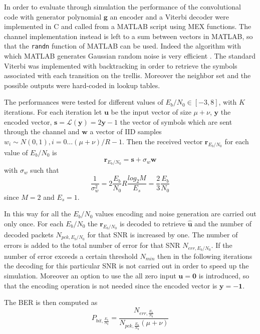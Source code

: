 \documentclass[10pt]{article}
\begin{document}
In order to evaluate through simulation the performance of the convolutional code with generator polynomial $\mathbf{g}$ an encoder and a Viterbi decoder were implemented in C and called from a MATLAB script using MEX functions. 
The channel implementation instead is left to a sum between vectors in MATLAB, so that the \texttt{randn} function of MATLAB can be used. Indeed the algorithm with which MATLAB generates Gaussian random noise is very efficient \cite{moler}. The standard Viterbi was implemented with backtracking in order to retrieve the symbols associated with each transition on the trellis. Moreover the neighbor set and the possible outputs were hard-coded in lookup tables. 


The performances were tested for different values of $E_b/N_0 \in [-3, 8]$, with $K$ iterations. For each iteration let $\mathbf{u}$ be the input vector of size $\mu + \nu$, $\mathbf{y}$ the encoded vector, $\mathbf{s} = \mathcal{L}(\mathbf{y}) = 2\mathbf{y} - 1$ the vector of symbols which are sent through the channel and $\mathbf{w}$ a vector of IID samples $w_i \sim N(0,1), i = 0 \dots (\mu + \nu)/R - 1$. Then the received vector $\mathbf{r}_{E_b/N_0}$ for each value of $E_b/N_0$ is 
\begin{equation}
	\mathbf{r}_{E_b/N_0} = \mathbf{s} + \sigma_w \mathbf{w}
\end{equation}
with $\sigma_w$ such that
\begin{equation}
	\frac{1}{\sigma_w^2} = 2\frac{E_b}{N_0}R\frac{log_2M}{E_s} = \frac{2}{3} \frac{E_b}{N_0}
\end{equation}
since $M=2$ and $E_s = 1$.

In this way for all the $E_b/N_0$ values encoding and noise generation are carried out only once. For each $E_b/N_0$ the $\mathbf{r}_{E_b/N_0}$ is decoded to retrieve $\mathbf{\hat{u}}$ and the number of decoded packets $N_{pck, E_b/N_0}$ for that SNR is increased by one. The number of errors is added to the total number of error for that SNR $N_{err, E_b/N_0}$. If the number of error exceeds a certain threshold $N_{min}$ then in the following iterations the decoding for this particular SNR is not carried out in order to speed up the simulation. Moreover an option to use the all zero input $\mathbf{u} = \mathbf{0}$ is introduced, so that the encoding operation is not needed since the encoded vector is $\mathbf{y} = -\mathbf{1}$. 

The BER is then computed as
\begin{equation}
	P_{bit, \frac{E_b}{N_0}} =\frac{N_{err, \frac{E_b}{N_0}}}{N_{pck, \frac{E_b}{N_0}}(\mu+\nu)}
\end{equation}
\end{document}
